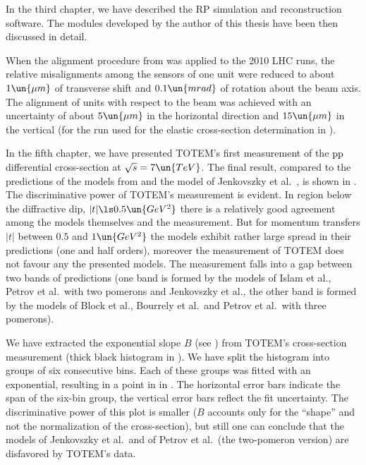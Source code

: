 In the third chapter, we have described the RP simulation and reconstruction software. The modules developed by the author of this thesis have been then discussed in detail.

When the alignment procedure from  was applied to the 2010 LHC runs, the relative misalignments among the sensors of one unit were reduced to about $1\un{\mu m}$ of transverse shift and $0.1\un{mrad}$ of rotation about the beam axis. The alignment of units with respect to the beam was achieved with an uncertainty of about $5\un{\mu m}$ in the horizontal direction and $15\un{\mu m}$ in the vertical (for the run used for the elastic cross-section determination in ).

In the fifth chapter, we have presented TOTEM's first measurement of the $\rm pp$ differential cross-section at $\sqrt s = 7\un{TeV}$. The final result, compared to the predictions of the models from  and the model of Jenkovszky et al.~, is shown in . The discriminative power of TOTEM's measurement is evident. In region below the diffractive dip, $|t| \ls 0.5\un{GeV^2}$ there is a relatively good agreement among the models themselves and the measurement. But for momentum transfers $|t|$ between $0.5$ and $1\un{GeV^2}$ the models exhibit rather large spread in their predictions (one and half orders), moreover the measurement of TOTEM does not favour any the presented models. The measurement falls into a gap between two bands of predictions (one band is formed by the models of Islam et al., Petrov et al.~with two pomerons and Jenkovszky et al., the other band is formed by the models of Block et al., Bourrely et al.~and Petrov et al.~with three pomerons).


We have extracted the exponential slope $B$ (see ) from TOTEM's cross-section measurement (thick black histogram in ). We have split the histogram into groups of six consecutive bins. Each of these groups was fitted with an exponential, resulting in a point in in . The horizontal error bars indicate the span of the six-bin group, the vertical error bars reflect the fit uncertainty. The discriminative power of this plot is smaller ($B$ accounts only for the ``shape'' and not the normalization of the cross-section), but still one can conclude that the models of Jenkovszky et al.~and of Petrov et al.~(the two-pomeron version) are disfavored by TOTEM's data.



